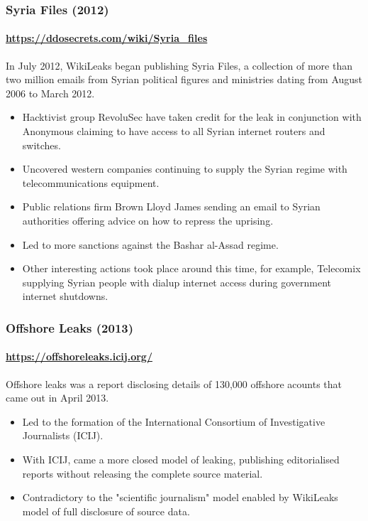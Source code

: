 \documentclass[aspectratio=169,usenames,dvipsnames]{beamer}
\begin{document}
\begin{frame}
  \frametitle{Syria Files (2012)}
  \framesubtitle{\url{https://ddosecrets.com/wiki/Syria_files}}

  In July 2012, WikiLeaks began publishing Syria Files, a collection of
  more than two million emails from Syrian political figures and ministries
  dating from August 2006 to March 2012.

  \pause

  \begin{itemize}[<+->]
    \item Hacktivist group RevoluSec have taken credit for the leak in
      conjunction with Anonymous claiming to have access to all Syrian
      internet routers and switches.
    \item Uncovered western companies continuing to supply
      the Syrian regime with telecommunications equipment.
    \item Public relations firm Brown Lloyd James sending an email to Syrian
      authorities offering advice on how to repress the uprising.
    \item Led to more sanctions against the Bashar al-Assad regime.
    \item Other interesting actions took place around this time, for example,
      Telecomix supplying Syrian people with dialup internet access during
      government internet shutdowns.
  \end{itemize}
\end{frame}

\begin{frame}
  \frametitle{Offshore Leaks (2013)}
  \framesubtitle{\url{https://offshoreleaks.icij.org/}}

  Offshore leaks was a report disclosing details of 130,000 offshore acounts
  that came out in April 2013.

  \pause
  \vspace{5mm}

  \begin{itemize}[<+->]
    \item Led to the formation of the International Consortium of
      Investigative Journalists (ICIJ).
    \item With ICIJ, came a more closed model of leaking, publishing
      editorialised reports without releasing the complete source material.
    \item Contradictory to the "scientific journalism" model enabled by
      WikiLeaks model of full disclosure of source data.
  \end{itemize}

\end{frame}
\end{document}
